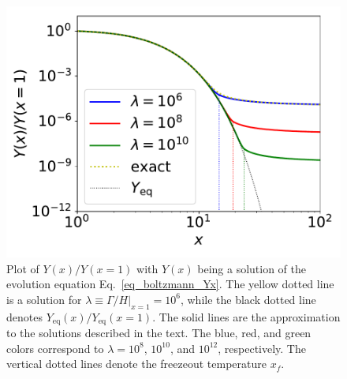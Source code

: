 \documentclass[12pt,twoside,book]{article}
\begin{document}
\begin{figure}[t]
 \centering
 \includegraphics[width=0.5\hsize]{DMrelic.pdf}
 \caption{Plot of $Y(x) / Y(x=1)$ with $Y(x)$ being a solution of the
 evolution equation Eq.~\eqref{eq_boltzmann_Yx}.  The yellow dotted
 line is a solution for $\lambda \equiv \left. \Gamma / H
 \right|_{x=1} = 10^6$, while the black dotted line denotes
 $Y_{\mathrm{eq}} (x) / Y_{\mathrm{eq}} (x=1)$.  The solid lines are
 the approximation to the solutions described in the text.  The blue,
 red, and green colors correspond to $\lambda = 10^8$, $10^{10}$, and
 $10^{12}$, respectively.  The vertical dotted lines denote the
 freezeout temperature $x_f$.}  \label{fig_DM_relic}
\end{figure}
\end{document}
